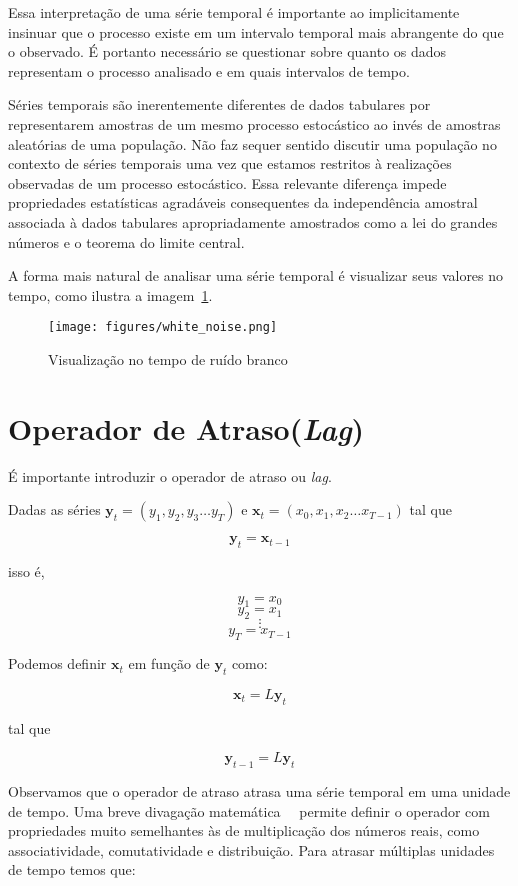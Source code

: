 Essa interpretação de uma série temporal é importante ao implicitamente
insinuar que o processo existe em um intervalo temporal mais abrangente do que
o observado. É portanto necessário se questionar sobre quanto os
dados representam o processo analisado e em quais intervalos de tempo.

Séries temporais são inerentemente diferentes de dados tabulares por
representarem amostras de um mesmo processo estocástico ao invés de amostras
aleatórias de uma população. Não faz sequer sentido discutir uma população no
contexto de séries temporais uma vez que estamos restritos à realizações
observadas de um processo estocástico. Essa relevante diferença impede
propriedades estatísticas agradáveis consequentes da independência amostral
associada à dados tabulares apropriadamente amostrados como a lei do grandes
números e o teorema do limite central.

A forma mais natural de analisar uma série temporal é visualizar seus valores
no tempo, como ilustra a imagem~\ref{fig:example}.

\begin{figure}[H]
    \centering
    \texttt{[image: figures/white\_noise.png]}
    \caption{Visualização no tempo de ruído branco}
    \label{fig:example}
\end{figure}


\section{Operador de Atraso(\emph{Lag})}

É importante introduzir o operador de atraso ou \emph{lag}.

Dadas as séries $\mathbf{y}_t = (y_1, y_2, y_3 \dots y_T)$ e
$\mathbf{x}_t = (x_0, x_1, x_2 \dots x_{T-1})$ tal que

$$ \mathbf{y}_t = \mathbf{x}_{t-1}$$

isso é,

$$ y_1 = x_0 $$
$$ y_2 = x_1 $$
$$ \vdots $$
$$ y_T = x_{T-1} $$

Podemos definir $\mathbf{x}_t$ em função de $\mathbf{y}_t$ como:

$$ \mathbf{x}_t = L\mathbf{y}_t $$

tal que

$$\mathbf{y}_{t-1} = L\mathbf{y}_t$$

Observamos que o operador de atraso atrasa uma série temporal em uma unidade de
tempo. Uma breve divagação matemática~~\cite{hamilton} permite definir o
operador com propriedades muito semelhantes às de multiplicação dos números
reais, como associatividade, comutatividade e distribuição. Para atrasar
múltiplas unidades de tempo temos que:

